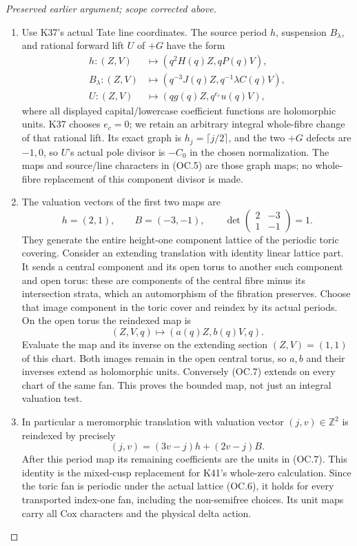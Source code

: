 \begin{proof}[Preserved earlier argument; scope corrected above]
\begin{enumerate}[label=\arabic*.]
\item Use K37's actual Tate line coordinates. The source period \(h\),
suspension \(B_\lambda\), and rational forward lift \(U\)
of \(+G\) have the form
\[
 \begin{aligned}
 h:(Z,V)&\longmapsto(q^2H(q)Z,qP(q)V),\\
 B_\lambda:(Z,V)&\longmapsto(q^{-3}J(q)Z,
                                      q^{-1}\lambda C(q)V),\\
 U:(Z,V)&\longmapsto(qg(q)Z,q^{e_c}u(q)V),
 \end{aligned}                                             \tag{OC.5}
\]
where all displayed capital/lowercase coefficient functions are
holomorphic units. K37 chooses \(e_c=0\); we retain an arbitrary
integral whole-fibre change of that rational lift. Its exact graph is
\(h_j=\lceil j/2\rceil\), and the two \(+G\) defects are
\(-1,0\), so \(U\)'s actual pole divisor is \(-C_0\)
in the chosen normalization. The maps and source/line characters
in (OC.5) are those graph maps; no whole-fibre replacement of this
component divisor is made.

\item The valuation vectors of the first two maps are
\[
                   h=(2,1),\qquad B=(-3,-1),\qquad
             \det\begin{pmatrix}2&-3\\1&-1\end{pmatrix}=1.
                                                               \tag{OC.6}
\]
They generate the entire height-one component lattice of the
periodic toric covering. Consider an extending translation with
identity linear lattice part. It sends a central component and its
open torus to another such component and open torus: these are
components of the central fibre minus its intersection strata, which
an automorphism of the fibration preserves. Choose that image
component in the toric cover and reindex by its actual periods. On
the open torus the reindexed map is
\[
                    (Z,V,q)\longmapsto(a(q)Z,b(q)V,q).     \tag{OC.7}
\]
Evaluate the map and its inverse on the extending section
\((Z,V)=(1,1)\) of this chart. Both images remain in the open
central torus, so \(a,b\) and their inverses extend as
holomorphic units. Conversely (OC.7) extends on every chart of
the same fan. This proves the bounded map, not just an integral
valuation test.

\item In particular a meromorphic translation with valuation vector
\((j,v)\in\mathbb Z^2\) is reindexed by precisely
\[
       (j,v)=(3v-j)h+(2v-j)B.                             \tag{OC.8}
\]
After this period map its remaining coefficients are the units in
(OC.7). This identity is the mixed-cusp replacement for K41's
whole-zero calculation. Since the toric fan is periodic under the
actual lattice (OC.6), it holds for every transported index-one fan,
including the non-semifree choices. Its unit maps carry all Cox
characters and the physical delta action.


\end{enumerate}
\end{proof}

